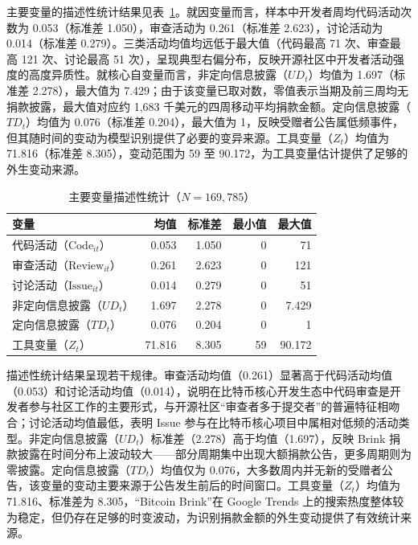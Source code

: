 主要变量的描述性统计结果见表~\ref{tab:desc-stats}。就因变量而言，样本中开发者周均代码活动次数为 0.053（标准差 1.050），审查活动为 0.261（标准差 2.623），讨论活动为 0.014（标准差 0.279）。三类活动均值均远低于最大值（代码最高 71 次、审查最高 121 次、讨论最高 51 次），呈现典型右偏分布，反映开源社区中开发者活动强度的高度异质性。就核心自变量而言，非定向信息披露（$UD_t$）均值为 1.697（标准差 2.278），最大值为 7.429；由于该变量已取对数，零值表示当期及前三周均无捐款披露，最大值对应约 1,683 千美元的四周移动平均捐款金额。定向信息披露（$TD_t$）均值为 0.076（标准差 0.204），最大值为 1，反映受赠者公告属低频事件，但其随时间的变动为模型识别提供了必要的变异来源。工具变量（$Z_t$）均值为 71.816（标准差 8.305），变动范围为 59 至 90.172，为工具变量估计提供了足够的外生变动来源。

\begin{table}[htbp]
    \centering
    \caption{主要变量描述性统计（$N = 169{,}785$）}
    \label{tab:desc-stats}
    \begin{tabularx}{\textwidth}{Xrrrr}
        \toprule
        变量 & 均值 & 标准差 & 最小值 & 最大值 \\
        \midrule
        代码活动（$\text{Code}_{it}$）      & 0.053 & 1.050 & 0 & 71 \\
        审查活动（$\text{Review}_{it}$）    & 0.261 & 2.623 & 0 & 121 \\
        讨论活动（$\text{Issue}_{it}$）     & 0.014 & 0.279 & 0 & 51 \\
        非定向信息披露（$UD_t$） & 1.697 & 2.278 & 0 & 7.429 \\
        定向信息披露（$TD_t$） & 0.076 & 0.204 & 0 & 1 \\
        工具变量（$Z_t$） & 71.816 & 8.305 & 59 & 90.172 \\
        \bottomrule
    \end{tabularx}
\end{table}

描述性统计结果呈现若干规律。审查活动均值（0.261）显著高于代码活动均值（0.053）和讨论活动均值（0.014），说明在比特币核心开发生态中代码审查是开发者参与社区工作的主要形式，与开源社区“审查者多于提交者”的普遍特征相吻合；讨论活动均值最低，表明 Issue 参与在比特币核心项目中属相对低频的活动类型。非定向信息披露（$UD_t$）标准差（2.278）高于均值（1.697），反映 Brink 捐款披露在时间分布上波动较大——部分周期集中出现大额捐款公告，更多周期则为零披露。定向信息披露（$TD_t$）均值仅为 0.076，大多数周内并无新的受赠者公告，该变量的变动主要来源于公告发生前后的时间窗口。工具变量（$Z_t$）均值为 71.816、标准差为 8.305，“Bitcoin Brink”在 Google Trends 上的搜索热度整体较为稳定，但仍存在足够的时变波动，为识别捐款金额的外生变动提供了有效统计来源。

